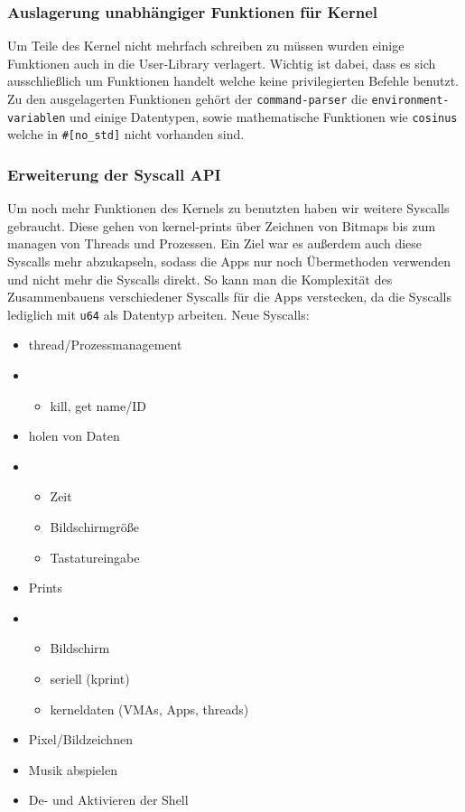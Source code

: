     \subsubsection{Auslagerung unabhängiger Funktionen für Kernel}
        Um Teile des Kernel nicht mehrfach schreiben zu müssen wurden einige Funktionen auch in die User-Library verlagert. Wichtig ist dabei, dass es sich ausschließlich um Funktionen handelt welche keine privilegierten Befehle benutzt. Zu den ausgelagerten Funktionen gehört der \verb|command-parser| die \verb|environment-variablen| und einige Datentypen, sowie mathematische Funktionen wie \verb|cosinus| welche in \verb|#[no_std]| nicht vorhanden sind.


    \subsubsection{Erweiterung der Syscall API}
        Um noch mehr Funktionen des Kernels zu benutzten haben wir weitere Syscalls gebraucht. Diese gehen von kernel-prints über Zeichnen von Bitmaps bis zum managen von Threads und Prozessen. \newline
        Ein Ziel war es außerdem auch diese Syscalls mehr abzukapseln, sodass die Apps nur noch Übermethoden verwenden und nicht mehr die Syscalls direkt. So kann man die Komplexität des Zusammenbauens verschiedener Syscalls für die Apps verstecken, da die Syscalls lediglich mit \verb|u64| als Datentyp arbeiten. \newline
        Neue Syscalls:
        \begin{itemize}
            \item thread/Prozessmanagement
            \item [] \begin{itemize}
                \item kill, get name/ID
            \end{itemize}
            \item holen von Daten
            \item [] \begin{itemize}
                \item Zeit
                \item Bildschirmgröße
                \item Tastatureingabe
            \end{itemize}
            \item Prints
            \item [] \begin{itemize}
                \item Bildschirm
                \item seriell (kprint)
                \item kerneldaten (VMAs, Apps, threads)
            \end{itemize}
            \item Pixel/Bildzeichnen
            \item Musik abspielen
            \item De- und Aktivieren der Shell
        \end{itemize}
